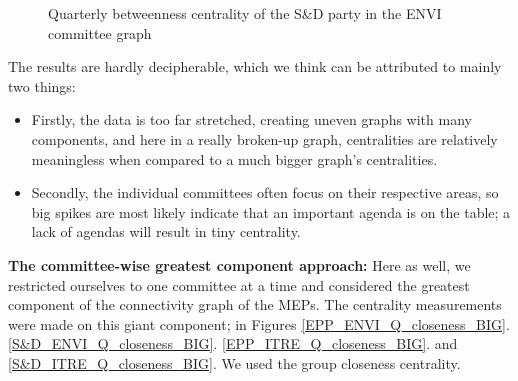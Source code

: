 \documentclass[lettersize,journal]{IEEEtran}
\begin{document}
\begin{figure}[h]
\begin{minipage}[b]{0.23\textwidth}
    \caption{Quarterly betweenness centrality of the S\&D party in the ENVI committee graph}
    \label{fig:btw_S&D}
  \end{minipage}

\end{figure}

The results are hardly decipherable, which we think can be attributed to mainly two things: 
\begin{itemize}
\item Firstly, the data is too far stretched, creating uneven graphs with many components, and here in a really broken-up graph, centralities are relatively meaningless when compared to a much bigger graph's centralities.
\item Secondly, the individual committees often focus on their respective areas, so big spikes are most likely indicate that an important agenda is on the table; a lack of agendas will result in tiny centrality.
\end{itemize}

\textbf{The committee-wise greatest component approach:} Here as well, we restricted ourselves to one committee at a time and considered the greatest component of the connectivity graph of the MEPs. The centrality measurements were made on this giant component; in Figures \ref{EPP_ENVI_Q_closeness_BIG}. \ref{S&D_ENVI_Q_closeness_BIG}. \ref{EPP_ITRE_Q_closeness_BIG}. and \ref{S&D_ITRE_Q_closeness_BIG}. We used the group closeness centrality.
\end{document}
